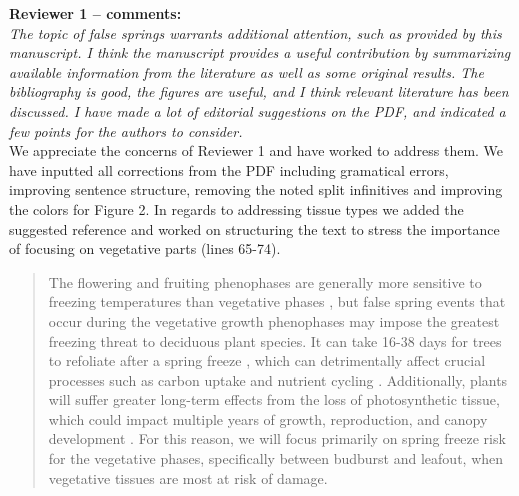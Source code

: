 \documentclass[11pt,a4paper]{article}
\begin{document}


\textbf {Reviewer 1 -- comments:} \\

\textit{The topic of false springs warrants additional attention, such as provided by this manuscript. I think the manuscript provides a useful contribution by summarizing available information from the literature as well as some original results. The bibliography is good, the figures are useful, and I think relevant literature has been discussed. I have made a lot of editorial suggestions on the PDF, and indicated a few points for the authors to consider.}\\


We appreciate the concerns of Reviewer 1 and have worked to address them. We have inputted all corrections from the PDF including gramatical errors, improving sentence structure, removing the noted split infinitives and improving the colors for Figure 2. In regards to addressing tissue types we added the suggested reference and worked on structuring the text to stress the importance of focusing on vegetative parts (lines 65-74).

\begin{quotation}
The flowering and fruiting phenophases are generally more sensitive to freezing temperatures than vegetative phases \citep{Inouye2000, Augspurger2009, Caradonna2016, Lenz2013}, but false spring events that occur during the vegetative growth phenophases may impose the greatest freezing threat to deciduous plant species. It can take 16-38 days for trees to refoliate after a spring freeze \citep{Gu2008, Augspurger2009, Augspurger2013, Menzel2015}, which can detrimentally affect crucial processes such as carbon uptake and nutrient cycling \citep{Hufkens2012, Richardson2013, Klosterman2018}. Additionally, plants will suffer greater long-term effects from the loss of photosynthetic tissue, which could impact multiple years of growth, reproduction, and canopy development \citep{Vitasse2014, Xie2015}.  For this reason, we will focus primarily on spring freeze risk for the vegetative phases, specifically between budburst and leafout, when vegetative tissues are most at risk of damage.
\end{quotation}
\end{document}
